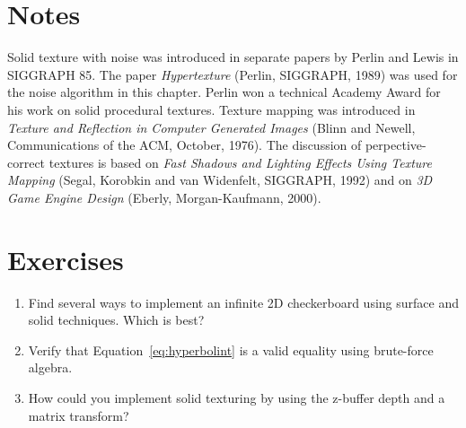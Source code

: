 \section*{Notes}

Solid texture with noise was introduced in
separate papers by Perlin and Lewis in SIGGRAPH 85.
The paper \emph{Hypertexture} (Perlin, SIGGRAPH, 1989)
was used  for the noise algorithm in this chapter.  Perlin won
a technical Academy Award for his work on solid procedural textures.
Texture mapping was introduced in \emph{Texture and Reflection in
Computer Generated Images} (Blinn and Newell, Communications of
the ACM, October, 1976).  The discussion of perpective-correct
textures is based on \emph{Fast Shadows and Lighting Effects Using
Texture Mapping} (Segal, Korobkin and van Widenfelt, SIGGRAPH, 1992)
and on \emph{3D Game Engine Design} (Eberly, Morgan-Kaufmann, 2000).



\section*{Exercises}

\begin{enumerate}
\item Find several ways to implement an infinite 2D checkerboard using
surface and solid techniques.  Which is best?
\item Verify that Equation~\ref{eq:hyperbolint} is a valid equality using
brute-force algebra.
\item How could you implement solid texturing by using the z-buffer 
depth and a matrix transform?
\end{enumerate}